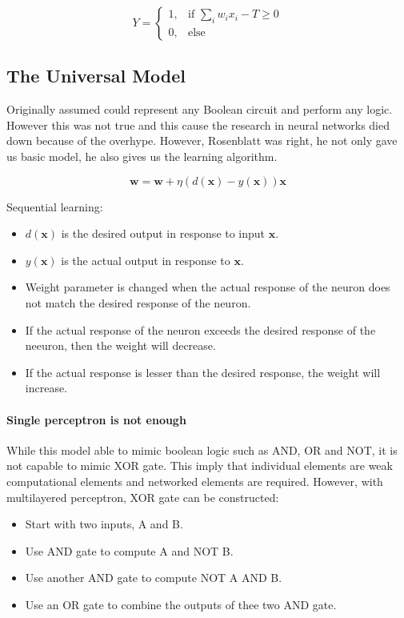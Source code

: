\[ 
Y = 
\begin{cases} 
	1, & \text{if } \sum_{i}w_ix_i - T \geq 0 \\
	0, & \text{else }
\end{cases}
\]

\subsection{The Universal Model}
Originally assumed could represent any Boolean circuit and perform any logic. However this was not true and this cause the research in neural networks died down because of the overhype. However, Rosenblatt was right, he not only gave us basic model, he also gives us the learning algorithm.

\[ \mathbf{w} = \mathbf{w} + \eta (d(\mathbf{x}) - y(\mathbf{x}))\mathbf{x} \]

Sequential learning:
\begin{itemize}
	\item $d(\mathbf{x})$ is the desired output in response to input $\mathbf{x}$.
	\item $y(\mathbf{x})$ is the actual output in response to $\mathbf{x}$.
	\item Weight parameter is changed when the actual response of the neuron does not match the desired response of the neuron.
	\item If the actual response of the neuron exceeds the desired response of the neeuron, then the weight will decrease.
	\item If the actual response is lesser than the desired response, the weight will increase.
\end{itemize}

\paragraph{Single perceptron is not enough}
While this model able to mimic boolean logic such as AND, OR and NOT, it is not capable to mimic XOR gate. This imply that individual elements are weak computational elements and networked elements are required. However, with multilayered perceptron, XOR gate can be constructed:
\begin{itemize}
	\item Start with two inputs, A and B.
	\item Use AND gate to compute A and NOT B.
	\item Use another AND gate to compute NOT A AND B.
	\item Use an OR gate to combine the outputs of thee two AND gate.
\end{itemize}

